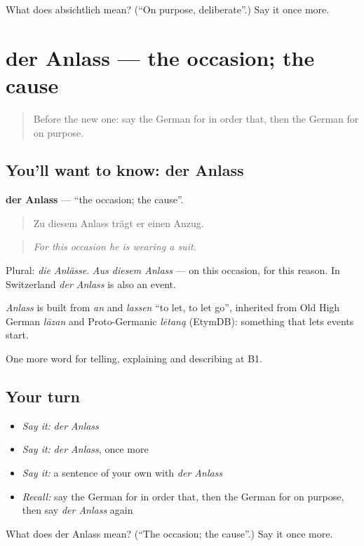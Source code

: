 \begin{tcolorbox}[breakable,colback=teal!4,colframe=teal!35!black,title={Before you move on}]
What does absichtlich mean? (\textquotedblleft{}On purpose, deliberate\textquotedblright{}.) Say it once more.
\end{tcolorbox}
\section[der Anlass]{der Anlass — the occasion; the cause}

\label{lesson:GE-C346-anlass}



\begin{quote}
Before the new one: say the German for in order that, then the German for on purpose.
\end{quote}

\subsection*{You'll want to know: der Anlass}
\textbf{der Anlass} — \textquotedblleft{}the occasion; the cause\textquotedblright{}.

\begin{quote}
Zu diesem Anlass trägt er einen Anzug.
\end{quote}

\begin{quote}
\emph{For this occasion he is wearing a suit.}
\end{quote}

Plural: \emph{die Anlässe}. \emph{Aus diesem Anlass} — on this occasion, for this reason. In Switzerland \emph{der Anlass} is also an event.

\begin{cousinweb}
\emph{Anlass} is built from \emph{an} and \emph{lassen} \textquotedblleft{}to let, to let go\textquotedblright{}, inherited from Old High German \emph{lāzan} and Proto-Germanic \emph{lētaną} (EtymDB): something that lets events start.
\end{cousinweb}

\begin{grammarlens}[title={What you've built}]
One more word for telling, explaining and describing at B1.
\end{grammarlens}

\subsection*{Your turn}
\begin{itemize}
\raggedright
  \item \emph{Say it:} \emph{der Anlass}
  \item \emph{Say it:} \emph{der Anlass}, once more
  \item \emph{Say it:} a sentence of your own with \emph{der Anlass}
  \item \emph{Recall:} say the German for in order that, then the German for on purpose, then say \emph{der Anlass} again
\end{itemize}

\begin{tcolorbox}[breakable,colback=teal!4,colframe=teal!35!black,title={Before you move on}]
What does der Anlass mean? (\textquotedblleft{}The occasion; the cause\textquotedblright{}.) Say it once more.
\end{tcolorbox}
